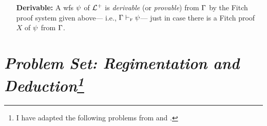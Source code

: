 \documentclass[a4paper, 11pt]{article} %
\begin{document}
\begin{enumerate}
	\item[\bf Derivable:]
	      A wfs $\psi$ of $\mathcal{L}^+$ is \textit{derivable} (or \textit{provable}) from $\Gamma$ by the Fitch proof system given above--- i.e., $\Gamma \vdash_{\textsc{f}} \psi$--- just in case there is a Fitch proof $X$ of $\psi$ from $\Gamma$.
\end{enumerate}



\section*{\it Problem Set: Regimentation and Deduction\footnote{I have adapted the following problems from \citet{Goldfarb2003} and \citet{Laboreo2005}.}}
\end{document}
